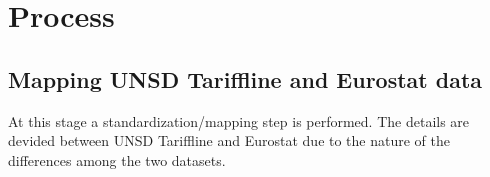 \documentclass[nojss]{jss}\usepackage[]{graphicx}\usepackage[]{color}
\begin{document}





\section{Process}

\subsection{Mapping UNSD Tariffline and Eurostat data}
At this stage a standardization/mapping step is performed. The details are devided between UNSD Tariffline and Eurostat due to the nature of the differences among the two datasets.
\end{document}
